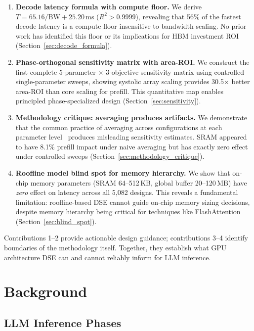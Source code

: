 \documentclass[sigconf,10pt]{acmart}
\begin{document}
\begin{enumerate}
\item \textbf{Decode latency formula with compute floor.}
We derive $T = 65.16/\text{BW} + 25.20$\,ms ($R^2 > 0.9999$), revealing
that 56\% of the fastest decode latency is a compute floor insensitive to
bandwidth scaling. No prior work has identified this floor or its
implications for HBM investment ROI (Section~\ref{sec:decode_formula}).

\item \textbf{Phase-orthogonal sensitivity matrix with area-ROI.}
We construct the first complete 5-parameter $\times$ 3-objective
sensitivity matrix using controlled single-parameter sweeps, showing
systolic array scaling provides 30.5$\times$ better area-ROI than core
scaling for prefill. This quantitative map enables principled
phase-specialized design (Section~\ref{sec:sensitivity}).

\item \textbf{Methodology critique: averaging produces artifacts.}
We demonstrate that the common practice of averaging across configurations
at each parameter level~\cite{llmcompass} produces misleading sensitivity
estimates. SRAM appeared to have 8.1\% prefill impact under naive
averaging but has exactly zero effect under controlled sweeps
(Section~\ref{sec:methodology_critique}).

\item \textbf{Roofline model blind spot for memory hierarchy.}
We show that on-chip memory parameters (SRAM 64--512\,KB, global buffer
20--120\,MB) have \emph{zero} effect on latency across all 5,082 designs.
This reveals a fundamental limitation: roofline-based DSE cannot guide
on-chip memory sizing decisions, despite memory hierarchy being critical
for techniques like FlashAttention~\cite{dao2022flashattention}
(Section~\ref{sec:blind_spot}).
\end{enumerate}

Contributions 1--2 provide actionable design guidance; contributions 3--4
identify boundaries of the methodology itself. Together, they establish
what GPU architecture DSE can and cannot reliably inform for LLM inference.

\section{Background}
\label{sec:background}

\subsection{LLM Inference Phases}
\end{document}

